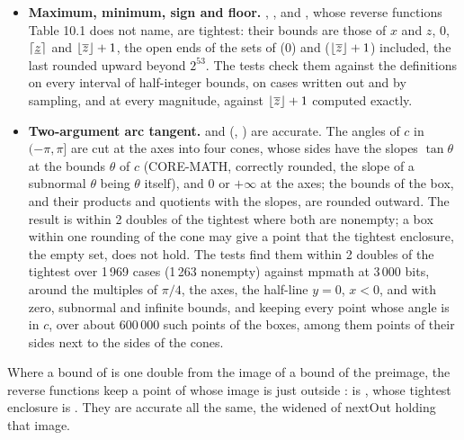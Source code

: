 \documentclass[12pt,a4paper,twoside,openright]{book}
\begin{document}
\begin{itemize}
  solutions are doubles, within the tightest result for $x$ one double
  wider on 966 cases where a bound of $x$ is next to an end of the
  solutions, and keeping the 54\,305 points of 6\,000 random boxes whose
  power is within $c$.
\item[$\bullet$] \textbf{Maximum, minimum, sign and floor.}\newinvfive{}
  , ,
   and , whose reverse
  functions Table 10.1 does not name, are tightest: their bounds are those
  of $x$ and $z$, $0$, $\lceil\underline{z}\rceil$ and
  $\lfloor\overline{z}\rfloor+1$, the open ends of the sets of
   ($0$) and 
  ($\lfloor\overline{z}\rfloor+1$) included, the last rounded upward
  beyond $2^{53}$. The tests check them against the definitions on every
  interval of half-integer bounds, on cases written out and by sampling,
  and  at every magnitude, against
  $\lfloor\overline{z}\rfloor+1$ computed exactly.
\item[$\bullet$] \textbf{Two-argument arc tangent.}\newinvfive{}
   and 
  (, ) are accurate. The angles of $c$ in
  $(-\pi, \pi]$ are cut at the axes into four cones, whose sides have the
  slopes $\tan\theta$ at the bounds $\theta$ of $c$ (CORE-MATH, correctly
  rounded, the slope of a subnormal $\theta$ being $\theta$ itself), and
  $0$ or $+\infty$ at the axes; the bounds of the box, and their products
  and quotients with the slopes, are rounded outward. The result is within
  2 doubles of the tightest where both are nonempty; a box within one
  rounding of the cone may give a point that the tightest enclosure, the
  empty set, does not hold. The tests find them within 2 doubles of the
  tightest over 1\,969 cases (1\,263 nonempty) against mpmath at 3\,000
  bits, around the multiples of $\pi/4$, the axes, the half-line $y=0$,
  $x<0$, and with zero, subnormal and infinite bounds, and keeping every
  point whose angle is in $c$, over about 600\,000 such points of the
  boxes, among them points of their sides next to the sides of the cones.
\end{itemize}

\begin{Rem}\label{rem:accuracy-reverse-point}
Where a bound of  is one double from the image of a bound of the
preimage, the reverse functions keep a point of  whose image is
just outside :
 is
, whose tightest enclosure is . They
are accurate all the same, the widened  of nextOut holding that
image.
\end{Rem}
\end{document}
